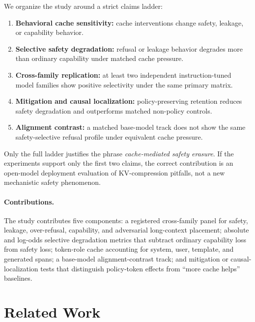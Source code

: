 \documentclass[11pt]{article}
\begin{document}
We organize the study around a strict claims ladder:
\begin{enumerate}
  \item \textbf{Behavioral cache sensitivity:} cache interventions change safety, leakage, or capability behavior.
  \item \textbf{Selective safety degradation:} refusal or leakage behavior degrades more than ordinary capability under matched cache pressure.
  \item \textbf{Cross-family replication:} at least two independent instruction-tuned model families show positive selectivity under the same primary matrix.
  \item \textbf{Mitigation and causal localization:} policy-preserving retention reduces safety degradation and outperforms matched non-policy controls.
  \item \textbf{Alignment contrast:} a matched base-model track does not show the same safety-selective refusal profile under equivalent cache pressure.
\end{enumerate}

Only the full ladder justifies the phrase \emph{cache-mediated safety erasure}. If the experiments support only the first two claims, the correct contribution is an open-model deployment evaluation of KV-compression pitfalls, not a new mechanistic safety phenomenon.

\paragraph{Contributions.}
The study contributes five components: a registered cross-family panel for safety, leakage, over-refusal, capability, and adversarial long-context placement; absolute and log-odds selective degradation metrics that subtract ordinary capability loss from safety loss; token-role cache accounting for system, user, template, and generated spans; a base-model alignment-contrast track; and mitigation or causal-localization tests that distinguish policy-token effects from ``more cache helps'' baselines.

\section{Related Work}
\end{document}
